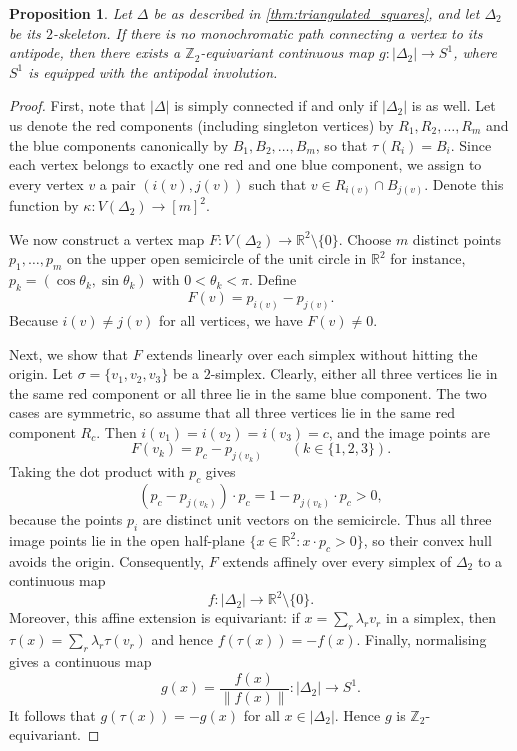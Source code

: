 \documentclass[10pt,a4paper]{amsart}
\newtheorem{proposition}{Proposition}
\begin{document}
\begin{proposition}\label{prop:existence-equivariant-map}
Let $\Delta$ be as described in \cref{thm:triangulated_squares}, and let $\Delta_2$ be its $2$-skeleton. If there is no monochromatic path connecting a vertex to its antipode, then there exists a $\mathbb Z_2$-equivariant continuous map $g\colon |\Delta_2| \to S^1$, where $S^1$ is equipped with the antipodal involution.
\end{proposition}

\begin{proof}
First, note that $|\Delta|$ is simply connected if and only if $|\Delta_2|$ is as well. Let us denote the red components (including singleton vertices) by $R_1,R_2,\dots,R_m$ and the blue components canonically by $B_1,B_2,\dots,B_m$, so that $\tau(R_i)=B_i$. Since each vertex belongs to exactly one red and one blue component, we assign to every vertex $v$ a pair $(i(v),j(v))$ such that $v\in R_{i(v)}\cap B_{j(v)}$. Denote this function by $\kappa:V(\Delta_2)\rightarrow [m]^2$.

We now construct a vertex map $F\colon V(\Delta_2) \to \mathbb{R}^2\setminus\{0\}$. Choose $m$ distinct points $p_1,\dots,p_m$ on the upper open semicircle of the unit circle in $\mathbb{R}^2$ for instance, $p_k=(\cos\theta_k,\sin\theta_k)$ with $0<\theta_k<\pi$. Define
\[
F(v)=p_{i(v)}-p_{j(v)}.
\]
Because $i(v)\neq j(v)$ for all vertices, we have $F(v)\neq 0$.

Next, we show that $F$ extends linearly over each simplex without hitting the origin. Let $\sigma=\{v_1,v_2,v_3\}$ be a $2$-simplex. Clearly, either all three vertices lie in the same red component or all three lie in the same blue component. The two cases are symmetric, so assume that all three vertices lie in the same red component $R_c$. Then $i(v_1)=i(v_2)=i(v_3)=c$, and the image points are
\[
F(v_k)=p_c-p_{j(v_k)} \qquad (k\in\{1,2,3\}).
\]
Taking the dot product with $p_c$ gives
\[
(p_c-p_{j(v_k)})\cdot p_c = 1-p_{j(v_k)}\cdot p_c>0,
\]
because the points $p_i$ are distinct unit vectors on the semicircle. Thus all three image points lie in the open half-plane $\{x\in\mathbb R^2 : x\cdot p_c>0\}$, so their convex hull avoids the origin. Consequently, $F$ extends affinely over every simplex of $\Delta_2$ to a continuous map
\[
f\colon |\Delta_2|\to\mathbb R^2\setminus\{0\}.
\]
Moreover, this affine extension is equivariant: if \(x=\sum_r\lambda_r v_r\) in a simplex, then \(\tau(x)=\sum_r\lambda_r\tau(v_r)\) and hence \(f(\tau(x))=-f(x)\). Finally, normalising gives a continuous map
\[
g(x)=\frac{f(x)}{\|f(x)\|}\colon |\Delta_2|\to S^1.
\]
It follows that $g(\tau(x))=-g(x)$ for all $x\in|\Delta_2|$. Hence $g$ is $\mathbb Z_2$-equivariant.
\end{proof}
\end{document}
